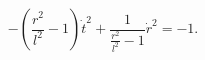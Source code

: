 \begin{equation} 
-(\frac{r^2}{l^2}-1)\dot t^2  +\frac{1}{\frac{r^2}{l^2}-1}\dot r^2=-1. 
\end{equation} 
